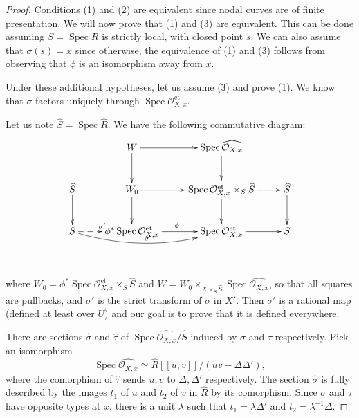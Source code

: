 \documentclass[a4paper,10pt,twoside]{article}
\newcommand{\on}[1]{\operatorname{#1}}
\renewcommand{\O}{\mathcal{O}}
\DeclareMathOperator{\spec}{Spec}
\theoremstyle{definition}
\theoremstyle{remark}
\renewcommand{\on}[1]{\operatorname{#1}}
\begin{document}
\begin{proof}
Conditions (1) and (2) are equivalent since nodal curves are of finite presentation. We will now prove that (1) and (3) are equivalent. This can be done assuming $S=\spec R$ is strictly local, with closed point $s$. We can also assume that $\sigma(s)=x$ since otherwise, the equivalence of (1) and (3) follows from observing that $\phi$ is an isomorphism away from $x$.

	Under these additional hypotheses, let us assume (3) and prove (1). We know that $\sigma$ factors uniquely through $\spec\O_{X,x}^{\on{et}}$.
	
		Let us note $\widehat{S}=\spec\widehat{R}$. We have the following commutative diagram: 
		\[
		\xymatrix{
			&W\ar[r]\ar[d]			& \spec\widehat{\O_{X,x}}\ar[d]					&				\\
			\widehat{S}		\ar[d]	& W_0\ar[r]\ar[d]		& \spec\O_{X,x}^{\on{et}}\times_S\widehat{S}\ar[d]\ar[r]	&\widehat{S}\ar[d]\\
			S\ar@{-->}[r]^{\sigma'}\ar@/_1pc/[rr]^\sigma	& \phi^*\spec\O_{X,x}^{\on{et}}\ar[r]^\phi			& \spec\O_{X,x}^{\on{et}}\ar[r]							&S\\
			\\
		}
		\]
		where $W_0=\phi^*\spec\O_{X,x}^{\on{et}}\times_S\widehat{S}$ and $W=W_0\times_{X\times_S\widehat{S}}\spec\widehat{\O_{X,x}}$, so that all squares are pullbacks, and $\sigma'$ is the strict transform of $\sigma$ in $X'$. Then $\sigma'$ is a rational map (defined at least over $U$) and our goal is to prove that it is defined everywhere.
		
		There are sections $\widehat{\sigma}$ and $\widehat{\tau}$ of $\spec\widehat{\O_{X,x}}/\widehat{S}$ induced by $\sigma$ and $\tau$ respectively. Pick an isomorphism
		\[
		\spec\widehat{\O_{X,x}}\simeq\widehat{R}[[u,v]]/(uv-\Delta\Delta'),
		\]
		where the comorphism of $\widehat{\tau}$ sends $u,v$ to $\Delta,\Delta'$ respectively. The section $\widehat{\sigma}$ is fully described by the images $t_1$ of $u$ and $t_2$ of $v$ in $\widehat{R}$ by its comorphism. Since $\sigma$ and $\tau$ have opposite types at $x$, there is a unit $\lambda$ such that $t_1=\lambda\Delta'$ and $t_2=\lambda^{-1}\Delta$.
		

\end{proof}
\end{document}

